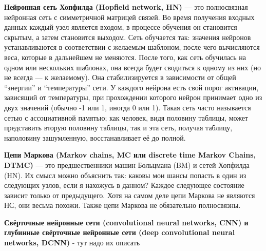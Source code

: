 \textbf{Нейронная сеть Хопфилда (Hopfield network, HN)} — это полносвязная нейронная сеть с симметричной матрицей связей. Во время получения входных данных каждый узел является входом, в процессе обучения он становится скрытым, а затем становится выходом. Сеть обучается так: значения нейронов устанавливаются в соответствии с желаемым шаблоном, после чего вычисляются веса, которые в дальнейшем не меняются. После того, как сеть обучилась на одном или нескольких шаблонах, она всегда будет сводиться к одному из них (но не всегда — к желаемому). Она стабилизируется в зависимости от общей “энергии” и “температуры” сети. У каждого нейрона есть свой порог активации, зависящий от температуры, при прохождении которого нейрон принимает одно из двух значений (обычно -1 или 1, иногда 0 или 1).  Такая сеть часто называется сетью с ассоциативной памятью; как человек, видя половину таблицы, может представить вторую половину таблицы, так и эта сеть, получая таблицу, наполовину зашумленную, восстанавливает её до полной. 

\textbf{Цепи Маркова (Markov chains, MC или discrete time Markov Chains, DTMC)} — это предшественники машин Больцмана (BM) и сетей Хопфилда (HN). Их смысл можно объяснить так: каковы мои шансы попасть в один из следующих узлов, если я нахожусь в данном? Каждое следующее состояние зависит только от предыдущего. Хотя на самом деле цепи Маркова не являются НС, они весьма похожи. Также цепи Маркова не обязательно полносвязны.

\textbf{Свёрточные нейронные сети (convolutional neural networks, CNN) и глубинные свёрточные нейронные сети (deep convolutional neural networks, DCNN)} - тут надо их описать
